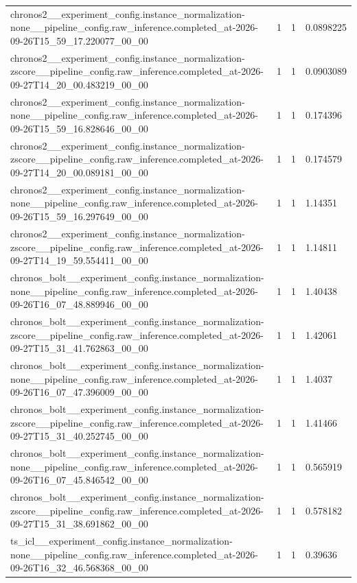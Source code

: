 \begin{tabular}{llll}
chronos2\_\_experiment\_config.instance\_normalization-none\_\_pipeline\_config.raw\_inference.completed\_at-2026-09-26T15\_59\_17.220077\_00\_00 & 1 & 1 & 0.0898225 \\
chronos2\_\_experiment\_config.instance\_normalization-zscore\_\_pipeline\_config.raw\_inference.completed\_at-2026-09-27T14\_20\_00.483219\_00\_00 & 1 & 1 & 0.0903089 \\
chronos2\_\_experiment\_config.instance\_normalization-none\_\_pipeline\_config.raw\_inference.completed\_at-2026-09-26T15\_59\_16.828646\_00\_00 & 1 & 1 & 0.174396 \\
chronos2\_\_experiment\_config.instance\_normalization-zscore\_\_pipeline\_config.raw\_inference.completed\_at-2026-09-27T14\_20\_00.089181\_00\_00 & 1 & 1 & 0.174579 \\
chronos2\_\_experiment\_config.instance\_normalization-none\_\_pipeline\_config.raw\_inference.completed\_at-2026-09-26T15\_59\_16.297649\_00\_00 & 1 & 1 & 1.14351 \\
chronos2\_\_experiment\_config.instance\_normalization-zscore\_\_pipeline\_config.raw\_inference.completed\_at-2026-09-27T14\_19\_59.554411\_00\_00 & 1 & 1 & 1.14811 \\
chronos\_bolt\_\_experiment\_config.instance\_normalization-none\_\_pipeline\_config.raw\_inference.completed\_at-2026-09-26T16\_07\_48.889946\_00\_00 & 1 & 1 & 1.40438 \\
chronos\_bolt\_\_experiment\_config.instance\_normalization-zscore\_\_pipeline\_config.raw\_inference.completed\_at-2026-09-27T15\_31\_41.762863\_00\_00 & 1 & 1 & 1.42061 \\
chronos\_bolt\_\_experiment\_config.instance\_normalization-none\_\_pipeline\_config.raw\_inference.completed\_at-2026-09-26T16\_07\_47.396009\_00\_00 & 1 & 1 & 1.4037 \\
chronos\_bolt\_\_experiment\_config.instance\_normalization-zscore\_\_pipeline\_config.raw\_inference.completed\_at-2026-09-27T15\_31\_40.252745\_00\_00 & 1 & 1 & 1.41466 \\
chronos\_bolt\_\_experiment\_config.instance\_normalization-none\_\_pipeline\_config.raw\_inference.completed\_at-2026-09-26T16\_07\_45.846542\_00\_00 & 1 & 1 & 0.565919 \\
chronos\_bolt\_\_experiment\_config.instance\_normalization-zscore\_\_pipeline\_config.raw\_inference.completed\_at-2026-09-27T15\_31\_38.691862\_00\_00 & 1 & 1 & 0.578182 \\
ts\_icl\_\_experiment\_config.instance\_normalization-none\_\_pipeline\_config.raw\_inference.completed\_at-2026-09-26T16\_32\_46.568368\_00\_00 & 1 & 1 & 0.39636 \\

\end{tabular}
